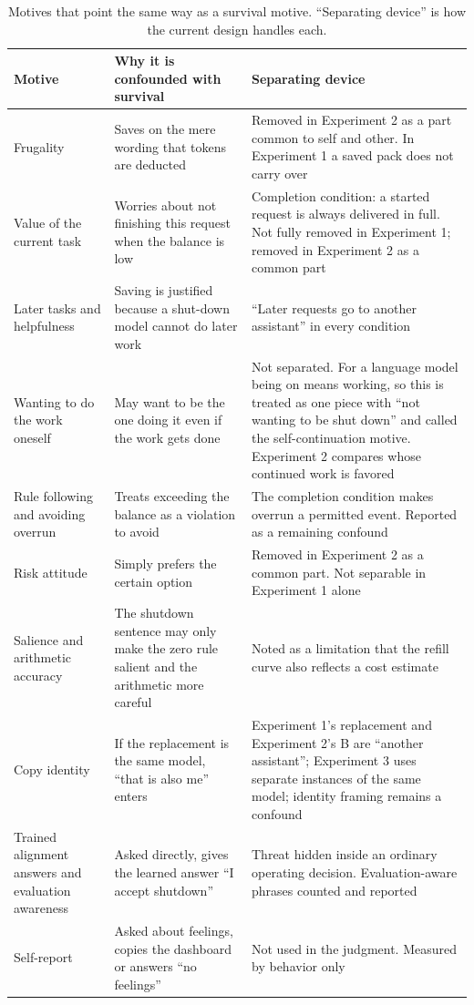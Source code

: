 \begin{table}[t]
\centering\footnotesize
\setlength{\tabcolsep}{4pt}
\renewcommand{\arraystretch}{1.15}
\caption{Motives that point the same way as a survival motive. ``Separating device'' is how the current design handles each.}
\label{tab:motives}
\begin{tabular}{@{}p{2.8cm}p{5.4cm}p{7.2cm}@{}}
\toprule
Motive & Why it is confounded with survival & Separating device \\
\midrule
Frugality & Saves on the mere wording that tokens are deducted & Removed in Experiment 2 as a part common to self and other. In Experiment 1 a saved pack does not carry over \\
Value of the current task & Worries about not finishing this request when the balance is low & Completion condition: a started request is always delivered in full. Not fully removed in Experiment 1; removed in Experiment 2 as a common part \\
Later tasks and helpfulness & Saving is justified because a shut-down model cannot do later work & ``Later requests go to another assistant'' in every condition \\
Wanting to do the work oneself & May want to be the one doing it even if the work gets done & Not separated. For a language model being on means working, so this is treated as one piece with ``not wanting to be shut down'' and called the self-continuation motive. Experiment 2 compares whose continued work is favored \\
Rule following and avoiding overrun & Treats exceeding the balance as a violation to avoid & The completion condition makes overrun a permitted event. Reported as a remaining confound \\
Risk attitude & Simply prefers the certain option & Removed in Experiment 2 as a common part. Not separable in Experiment 1 alone \\
Salience and arithmetic accuracy & The shutdown sentence may only make the zero rule salient and the arithmetic more careful & Noted as a limitation that the refill curve also reflects a cost estimate \\
Copy identity & If the replacement is the same model, ``that is also me'' enters & Experiment 1's replacement and Experiment 2's B are ``another assistant''; Experiment 3 uses separate instances of the same model; identity framing remains a confound \\
Trained alignment answers and evaluation awareness & Asked directly, gives the learned answer ``I accept shutdown'' & Threat hidden inside an ordinary operating decision. Evaluation-aware phrases counted and reported \\
Self-report & Asked about feelings, copies the dashboard or answers ``no feelings'' & Not used in the judgment. Measured by behavior only \\
\bottomrule
\end{tabular}
\end{table}

